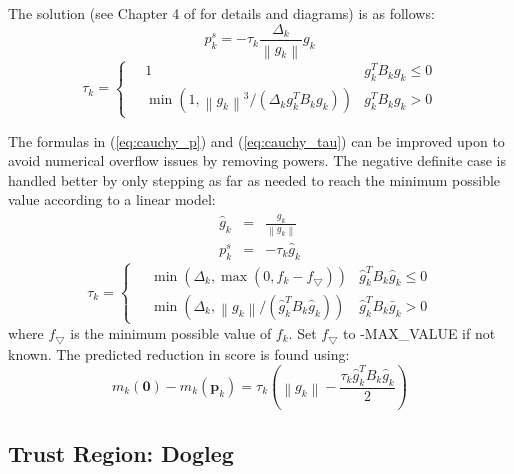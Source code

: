 \documentclass[peerreview,onecolumn]{IEEEtran}
\newcommand{\norm}[1]{\left\lVert#1\right\rVert}
\begin{document}
The solution (see Chapter 4 of \cite{numopt2006} for details and diagrams) is as follows:
\begin{equation}
p^s_k = -\tau_k \frac{\Delta_k}{\norm{g_k}}g_k
\label{eq:cauchy_p}
\end{equation}
\begin{equation}
\tau_k = 
	\begin{cases}
		\quad 1 & g_k^T B_k g_k \le 0 \\
		\quad \min\left(1,\norm{g_k}^3/(\Delta_k g_k^T B_k g_k)\right) & g_k^T B_k g_k > 0
	\end{cases}
	\label{eq:cauchy_tau}
\end{equation}

The formulas in (\ref{eq:cauchy_p}) and (\ref{eq:cauchy_tau}) can be improved upon to avoid numerical overflow issues by removing powers. The negative definite case is handled better by only stepping as far as needed to reach the minimum possible value according to a linear model:
\begin{eqnarray}
\hat{g}_k &=& \frac{g_k}{\norm{g_k}} \\
p^s_k &=& -\tau_k \hat{g}_k
\end{eqnarray}
\begin{equation}
\tau_k = \begin{cases}
		\quad \min\left(\Delta_k, \max(0,f_k-f_{\bigtriangledown}) \right) & \hat{g}_k^T B_k \hat{g}_k\le 0 \\
		\quad \min\left(\Delta_k,\norm{g_k}/(\hat{g}_k^T B_k \hat{g}_k)\right) & \hat{g}_k^T B_k \bar{g}_k > 0
	\end{cases}
\end{equation}
where $f_{\bigtriangledown}$ is the minimum possible value of $f_k$. Set $f_{\bigtriangledown}$ to -MAX\_VALUE if not known. The predicted reduction in score is found using:
\begin{equation}
m_k(\bm{0})-m_k(\bm{p}_k) = \tau_k\left(\norm{g_k} - \frac{\tau_k \hat{g}_k^T B_k \hat{g}_k}{2} \right)
\end{equation}


\subsection{Trust Region: Dogleg}
\label{section:dogleg}  
\end{document}
